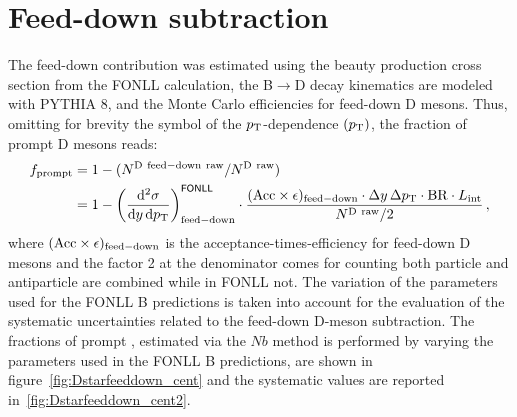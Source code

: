 \linenumbers

\section{Feed-down subtraction}

The feed-down contribution was estimated using 
the beauty production cross section from the FONLL calculation,
the B$\rightarrow$D decay kinematics are modeled with PYTHIA 8,
and the Monte Carlo efficiencies for feed-down D mesons. Thus, omitting for brevity the symbol of the $p_{\rm T}$-dependence $(p_{\rm T})$, the fraction of prompt D mesons reads:
\begin{equation}
 \label{eq:fcNbMethod}
 \begin{split}
   f_{\rm prompt} &= 1-(N^{\rm D~feed-down~raw}/N^{\rm D~raw})\\
   &= 1 -  \left( \frac{{\rm d}^2 \sigma}{{\rm d}y \, {\rm d}p_{\rm T} }
\right)^{{\sf FONLL}} _{{\rm feed-down}} \cdot
\frac{({\rm Acc}\times\epsilon)_{\rm feed-down}\cdot\Delta y \, \Delta p_{\rm T}
\cdot {\rm BR} \cdot L_{\rm int}  }{ N^{\rm D~raw }  / 2} \, ,
 \end{split}
\end{equation}
where $({\rm Acc}\times\epsilon)_{{\rm feed-down}}$ is the 
acceptance-times-efficiency for feed-down D mesons and the factor 2 at the denominator
comes for counting both particle and antiparticle
are combined while in FONLL not. The variation of the parameters used for the FONLL B predictions is taken into account for the evaluation of the systematic uncertainties related to the feed-down D-meson subtraction. The fractions of prompt \Dstar , estimated via the $Nb$ method is performed by varying the parameters used in the FONLL B predictions, are shown in figure~\ref{fig:Dstarfeeddown_cent} and the systematic values are reported in~\ref{fig:Dstarfeeddown_cent2}.





